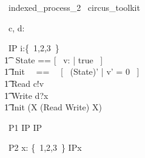 \begin{zsection}
  \SECTION\ indexed\_process\_2 \parents\ circus\_toolkit
\end{zsection}

\begin{circus}
	\circchannel\ c, d: \nat \\
\end{circus}

\begin{circus}
    \circprocess\ IP \circdef i:\{~1,2,3~\} \circindex \circbegin \\
        \t1 \circstate\ State == [~ v: \nat | true ~] \\
        \t1 Init ~~==~~ [~ (State)' | v' = 0 ~] \\
        \t1 Read \circdef c!v \then \Skip \\
        \t1 Write \circdef d?x \then \Skip \\
        \t1 \circspot \lschexpract Init \rschexpract \circseq (\circmu X \circspot (Read \extchoice Write) \circseq X) \\ 
	\circend
\end{circus}

\begin{circus}
    \circprocess\ P1 \circdef IP  \rcircindex \interleave IP  \rcircindex
\end{circus}

\begin{circus}
    \circprocess\ P2 \circdef \Interleave x: \{~1,2,3~\} \circspot IP\lcircindex x \rcircindex \\
\end{circus}
